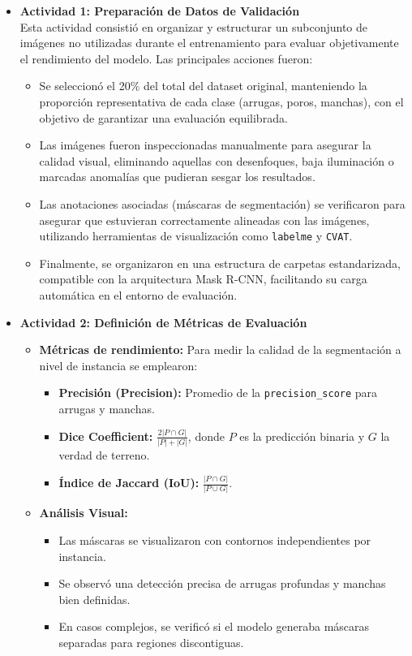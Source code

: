 \begin{enumerate}
\begin{itemize}
    \item \textbf{Actividad 1: Preparación de Datos de Validación} \\
    Esta actividad consistió en organizar y estructurar un subconjunto de imágenes no utilizadas durante el entrenamiento para evaluar objetivamente el rendimiento del modelo. Las principales acciones fueron:
    \begin{itemize}
      \item Se seleccionó el 20\% del total del dataset original, manteniendo la proporción representativa de cada clase (arrugas, poros, manchas), con el objetivo de garantizar una evaluación equilibrada.
      \item Las imágenes fueron inspeccionadas manualmente para asegurar la calidad visual, eliminando aquellas con desenfoques, baja iluminación o marcadas anomalías que pudieran sesgar los resultados.
      \item Las anotaciones asociadas (máscaras de segmentación) se verificaron para asegurar que estuvieran correctamente alineadas con las imágenes, utilizando herramientas de visualización como \texttt{labelme} y \texttt{CVAT}.
      \item Finalmente, se organizaron en una estructura de carpetas estandarizada, compatible con la arquitectura Mask R-CNN, facilitando su carga automática en el entorno de evaluación.
    \end{itemize}
  
    \item \textbf{Actividad 2: Definición de Métricas de Evaluación}
    \begin{itemize}
      \item \textbf{Métricas de rendimiento:} Para medir la calidad de la segmentación a nivel de instancia se emplearon:
      \begin{itemize}
        \item \textbf{Precisión (Precision):} Promedio de la \texttt{precision\_score} para arrugas y manchas.
        \item \textbf{Dice Coefficient:} \(\displaystyle \frac{2|P \cap G|}{|P| + |G|}\), donde \(P\) es la predicción binaria y \(G\) la verdad de terreno.
        \item \textbf{Índice de Jaccard (IoU):} \(\displaystyle \frac{|P \cap G|}{|P \cup G|}\).
      \end{itemize}
  
      \item \textbf{Análisis Visual:}
      \begin{itemize}
        \item Las máscaras se visualizaron con contornos independientes por instancia.
        \item Se observó una detección precisa de arrugas profundas y manchas bien definidas.
        \item En casos complejos, se verificó si el modelo generaba máscaras separadas para regiones discontiguas.
      \end{itemize}
  

\end{itemize}
\end{itemize}
\end{enumerate}
